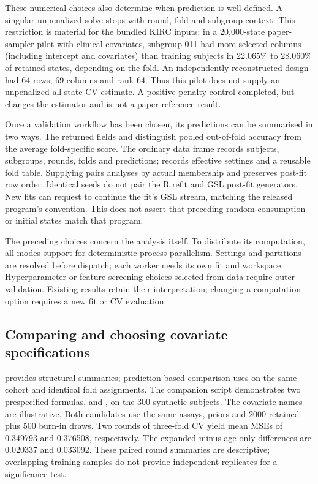\documentclass[article]{jss}
\begin{document}
These numerical choices also determine when prediction is well defined.
A singular unpenalized solve stops with round, fold and subgroup context.
This restriction is material for the bundled KIRC inputs: in a 20,000-state
paper-sampler pilot with clinical covariates, subgroup 011 had more selected
columns (including intercept and covariates) than training subjects in
22.065\% to 28.060\% of retained states, depending on the fold. An independently
reconstructed design had 64 rows, 69 columns and rank 64. Thus this pilot does
not supply an unpenalized all-state CV estimate. A positive-penalty control
completed, but changes the estimator and is not a paper-reference result.


Once a validation workflow has been chosen, its predictions can be summarised
in two ways. The returned fields  and  distinguish pooled
out-of-fold accuracy from the average fold-specific score. The ordinary
 data frame records subjects, subgroups, rounds, folds and
predictions;  records effective settings and a reusable fold
table. Supplying  pairs analyses by actual
membership and preserves post-fit row order. Identical seeds do not pair the
R refit and GSL post-fit generators. New fits can request
 to continue the fit's GSL stream, matching the
released program's convention. This does not assert that preceding random
consumption or initial states match that program.

The preceding choices concern the analysis itself. To distribute its computation,
all modes support  for deterministic process parallelism.
Settings and partitions are resolved before dispatch; each worker needs its own
fit and workspace. Hyperparameter or feature-screening choices selected from
data require outer validation. Existing results retain their interpretation;
changing a computation option requires a new fit or CV evaluation.

\subsection{Comparing and choosing covariate specifications}\label{sec:covariate-comparison}

 provides structural summaries; prediction-based comparison
uses  on the same cohort and identical fold assignments.
The companion script demonstrates two prespecified formulas,
 and
, on the 300 synthetic subjects.
The covariate names are illustrative.
Both candidates use the same assays, priors and 2000 retained plus 500 burn-in
draws. Two rounds of three-fold CV yield mean MSEs of 0.349793 and 0.376508,
respectively. The expanded-minus-age-only differences are 0.020337 and 0.033092.
These paired round summaries are descriptive; overlapping training samples do
not provide independent replicates for a significance test.
\end{document}
